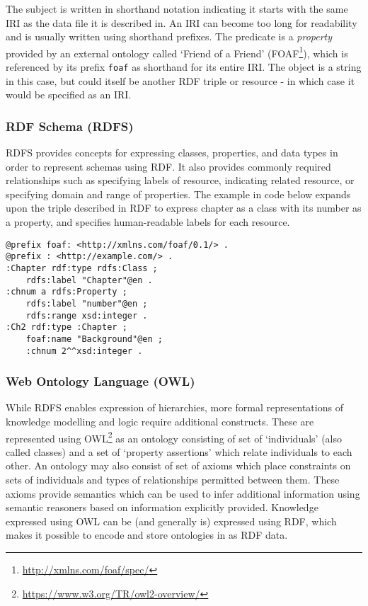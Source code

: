 The subject is written in shorthand notation indicating it starts with the same IRI as the data file it is described in. An IRI can become too long for readability and is usually written using shorthand prefixes.
The predicate is a \textit{property} provided by an external ontology called `Friend of a Friend' (FOAF\footnote{\url{http://xmlns.com/foaf/spec/}}), which is referenced by its prefix \texttt{foaf} as shorthand for its entire IRI.
The object is a string in this case, but could itself be another RDF triple or resource - in which case it would be specified as an IRI.

\subsubsection{RDF Schema (RDFS)}
RDFS provides concepts for expressing classes, properties, and data types in order to represent schemas using RDF. It also provides commonly required relationships such as specifying labels of resource, indicating related resource, or specifying domain and range of properties. The example in code below expands upon the triple described in RDF to express chapter as a class with its number as a property, and specifies human-readable labels for each resource.
\begin{verbatim}
@prefix foaf: <http://xmlns.com/foaf/0.1/> .
@prefix : <http://example.com/> .
:Chapter rdf:type rdfs:Class ;
    rdfs:label "Chapter"@en .
:chnum a rdfs:Property ;
    rdfs:label "number"@en ;
    rdfs:range xsd:integer .
:Ch2 rdf:type :Chapter ;
    foaf:name "Background"@en ; 
    :chnum 2^^xsd:integer .
\end{verbatim}

\subsubsection{Web Ontology Language (OWL)}
While RDFS enables expression of hierarchies, more formal representations of knowledge modelling and logic require additional constructs. These are represented using OWL\footnote{\url{https://www.w3.org/TR/owl2-overview/}} as an ontology consisting of set of `individuals' (also called classes) and a set of `property assertions' which relate individuals to each other.
An ontology may also consist of set of axioms which place constraints on sets of individuals and types of relationships permitted between them. These axioms provide semantics which can be used to infer additional information using semantic reasoners based on information explicitly provided.
Knowledge expressed using OWL can be (and generally is) expressed using RDF, which makes it possible to encode and store ontologies in as RDF data.

